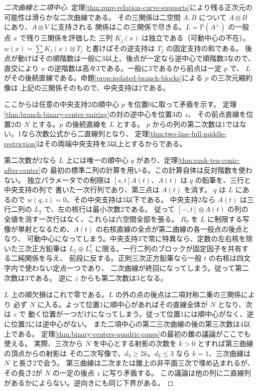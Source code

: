 \begin{proof}[二次曲線と二項中心]
定理\ref{thm:pure-relation-curve-supports}により残る正次元の可能性は滑らかな二次曲線である。
その三関係は二空間 $A,B$ について $A\otimes B$ にあり、$A\otimes V$ に支持される
関係はこの三関係で尽きる。$L=\mathbb P(A^\perp)$ の一般点 $x$ で残り三関係を評価した
三列 $K_j(x)$ は独立である（可動中心の不在）。
$w(x)=\sum K_j(x)\otimes T_j$ と書けばその逆支持は $T_j$ の固定支持の和である。
後点が動けばその順階数は一般に3以上、後点が一定なら逆中心で順階数3なので、
直交により $x$ の逆階数は高々3である。一般に3であるから前点は一定 $p$ で、
$L$ がその後続直線である。命題\ref{prop:isolated-branch-blocks}による $p$ の三次元縮約像は
上記の三関係そのもので、中央支持は2である。

ここからは任意の中央支持2の順中心 $p$ を位置0に取って矛盾を示す。
定理\ref{thm:branch-binary-center-pairing}の対の逆中心を位置3の $z$、
その前点直線を位置2の $N$ とする。$p$ の後続直線を $L$ とする。
$p$ からの列の第二次数は1ではない。1なら次数公式から二直線列となり、
定理\ref{thm:two-line-full-middle-restriction}はその両端中央支持を3以上とするからである。

第二次数が2なら $L$ 上には唯一の順中心 $q$ があり、定理\ref{thm:rank-ten-conic-after-center}の
最初の標準二列の計算を用いる。この計算自体は反対階数を使わない。
独立パラメータでの制限は $[s,t]A(t)$、$A(t)$ は $q$ の鉛筆を、三行と中央支持の列で
書いた一次行列であり、第三点は $A(t)$ を消す。
$q$ は $L$ にあるので $w(q,z)=0$、その中央支持は3以下である。
中央支持2なら $A(t)$ は三行二列の $L_2$ で、左の核行は最小次数2である。
従って $[-,t]\otimes A(t)$ の列の全値を消す一次行はなく、これらは六空間全部を張る。
$R_0$ を $L$ に制限する写像が単射となるため、$A(t)$ の右核直線の全点が第二曲線の各一般点の後点となり、
可動中心になってしまう。中央支持3で常に特異なら、定数の左右核を除いた三次正方鉛筆は
$L_1\oplus L_1^{\mathsf t}$ に限る。一行二列のブロックが固定因子を共有する二純関係を与え、
前段に反する。正則三次正方鉛筆なら一般 $t$ の右核は四文字内で使わない定点一つであり、
二次曲線が終回になってしまう。従って第二次数は3である。
逆に $z$ からも第二次数は3となる。

$L$ 上の順欠損はこれで零である。$L$ の外の点の後点は二項対称二乗の三関係により
必ず $N$ に入る。よって位置1に順中心があればその直線全体が $N$ となり、次は $z$ で
動く位置が一つだけになってしまう。従って位置1には順中心がなく、逆に位置2には逆中心がない。
また二項中心の第二三次曲線の後の第三次数は4以上である。
定理\ref{thm:binary-centers-quadric-cones}の最初の錐の議論がここでも使える。
実際、三次から $N$ を中心とする射影の次数を $k>0$ とすれば第三曲線の頂点からの射影は
その二次写像で、$d_3\ge2k$。$d_3\le3$ なら $k=1$、三次曲線は $N$ と長さ2で会う。
第三曲線は二次または錐上の非平面三次で埋め込まれるが、その長さ2が $N$ の一定の後点 $z$ に写り矛盾する。
この議論は他の列に二直線列があるかによらない。逆向きにも同じ下界がある。


\end{proof}
